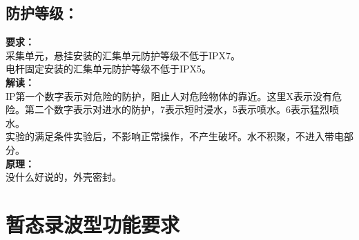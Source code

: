 \documentclass{article}
\begin{document}
\begin{CJK}{UTF8}{gbsn}
\subsection{ 防护等级：}
	\par
	\textbf{要求：}\\
	采集单元，悬挂安装的汇集单元防护等级不低于IPX7。\\
	电杆固定安装的汇集单元防护等级不低于IPX5。\\
	\textbf{解读：}\\
	IP第一个数字表示对危险的防护，阻止人对危险物体的靠近。这里X表示没有危险。第二个数字表示对进水的防护，7表示短时浸水，5表示喷水。6表示猛烈喷水。\\
	实验的满足条件实验后，不影响正常操作，不产生破坏。水不积聚，不进入带电部分。\\
	\textbf{原理：}\\
	没什么好说的，外壳密封。

\section{暂态录波型功能要求}

\end{CJK}
\end{document}
